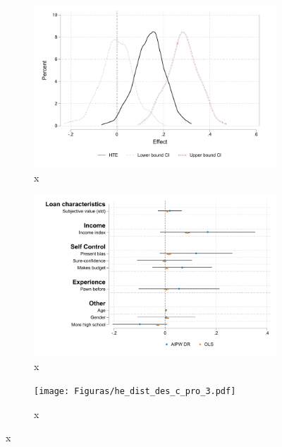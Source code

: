 \documentclass[11pt]{article}
\begin{document}
\begin{figure}[H]
    \caption{Heterogeneous Treatment Effect for Paid Loan}
    \label{heterogeneous_paid_loan}
    \begin{center}
    \begin{subfigure}{0.3\textwidth}
        \caption{x}
        \centering
        \includegraphics[width=\textwidth]{Figuras/he_dist_des_c_pro_2.pdf}
    \end{subfigure}
    \begin{subfigure}{0.3\textwidth}
        \caption{x}
        \centering
        \includegraphics[width=\textwidth]{Figuras/HE/he_int_vertical_des_c_pro_2.pdf}
    \end{subfigure}
    \begin{subfigure}{0.3\textwidth}
        \caption{x}
        \centering
        \texttt{[image: Figuras/he\_dist\_des\_c\_pro\_3.pdf]}
    \end{subfigure}

\end{center}
\end{figure}
\end{document}
